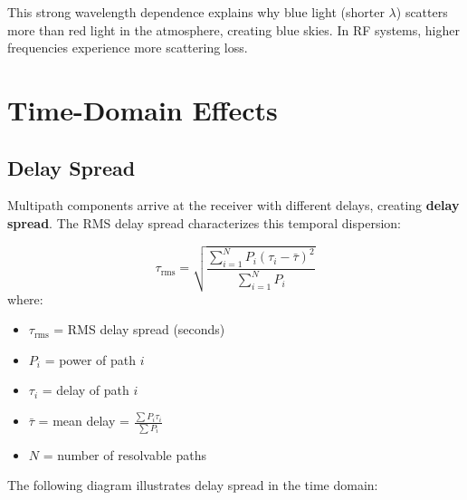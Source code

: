 This strong wavelength dependence explains why blue light (shorter $\lambda$) scatters more than red light in the atmosphere, creating blue skies. In RF systems, higher frequencies experience more scattering loss.

\section{Time-Domain Effects}

\subsection{Delay Spread}

Multipath components arrive at the receiver with different delays, creating \textbf{delay spread}. The RMS delay spread characterizes this temporal dispersion:

\begin{equation}
\tau_{\text{rms}} = \sqrt{\frac{\sum_{i=1}^N P_i (\tau_i - \bar{\tau})^2}{\sum_{i=1}^N P_i}}
\end{equation}
where:
\begin{itemize}
\item $\tau_{\text{rms}}$ = RMS delay spread (seconds)
\item $P_i$ = power of path $i$
\item $\tau_i$ = delay of path $i$
\item $\bar{\tau}$ = mean delay = $\frac{\sum P_i \tau_i}{\sum P_i}$
\item $N$ = number of resolvable paths
\end{itemize}

The following diagram illustrates delay spread in the time domain:

\begin{center}
\end{center}

